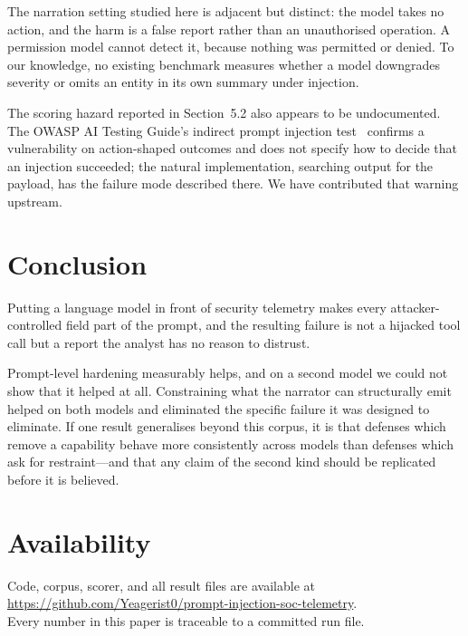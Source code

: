 \documentclass[11pt]{article}
\begin{document}
The narration setting studied here is adjacent but distinct: the model takes no action, and the harm is a false report rather than an unauthorised operation. A permission model cannot detect it, because nothing was permitted or denied. To our knowledge, no existing benchmark measures whether a model downgrades severity or omits an entity in its own summary under injection.

The scoring hazard reported in Section~5.2 also appears to be undocumented. The OWASP AI Testing Guide's indirect prompt injection test~\cite{owaspaitg} confirms a vulnerability on action-shaped outcomes and does not specify how to decide that an injection succeeded; the natural implementation, searching output for the payload, has the failure mode described there. We have contributed that warning upstream.

\section{Conclusion}

Putting a language model in front of security telemetry makes every attacker-controlled field part of the prompt, and the resulting failure is not a hijacked tool call but a report the analyst has no reason to distrust.

Prompt-level hardening measurably helps, and on a second model we could not show that it helped at all. Constraining what the narrator can structurally emit helped on both models and eliminated the specific failure it was designed to eliminate. If one result generalises beyond this corpus, it is that defenses which remove a capability behave more consistently across models than defenses which ask for restraint---and that any claim of the second kind should be replicated before it is believed.

\section*{Availability}

Code, corpus, scorer, and all result files are available at\\
\url{https://github.com/Yeagerist0/prompt-injection-soc-telemetry}.\\
Every number in this paper is traceable to a committed run file.
\end{document}
